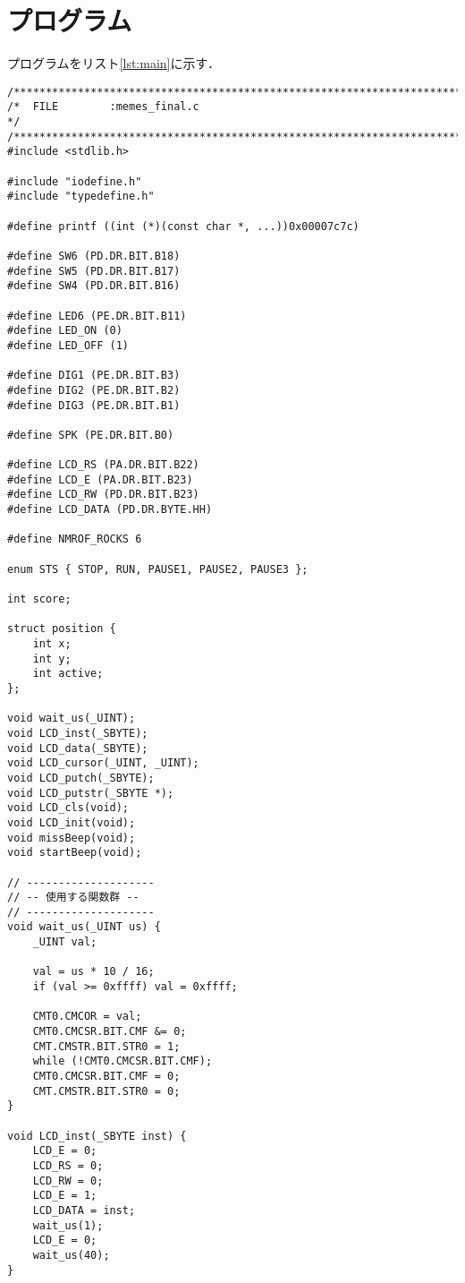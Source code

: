 \documentclass[a4paper,11pt,dvipdfmx]{jsarticle}
\begin{document}
\section{プログラム}
プログラムをリスト\ref{lst:main}に示す．

\begin{lstlisting}[caption=main.c, label=lst:main]
  /***********************************************************************/
/*  FILE        :memes_final.c                                         */
/***********************************************************************/
#include <stdlib.h>

#include "iodefine.h"
#include "typedefine.h"

#define printf ((int (*)(const char *, ...))0x00007c7c)

#define SW6 (PD.DR.BIT.B18)
#define SW5 (PD.DR.BIT.B17)
#define SW4 (PD.DR.BIT.B16)

#define LED6 (PE.DR.BIT.B11)
#define LED_ON (0)
#define LED_OFF (1)

#define DIG1 (PE.DR.BIT.B3)
#define DIG2 (PE.DR.BIT.B2)
#define DIG3 (PE.DR.BIT.B1)

#define SPK (PE.DR.BIT.B0)

#define LCD_RS (PA.DR.BIT.B22)
#define LCD_E (PA.DR.BIT.B23)
#define LCD_RW (PD.DR.BIT.B23)
#define LCD_DATA (PD.DR.BYTE.HH)

#define NMROF_ROCKS 6

enum STS { STOP, RUN, PAUSE1, PAUSE2, PAUSE3 };

int score;

struct position {
    int x;
    int y;
    int active;
};

void wait_us(_UINT);
void LCD_inst(_SBYTE);
void LCD_data(_SBYTE);
void LCD_cursor(_UINT, _UINT);
void LCD_putch(_SBYTE);
void LCD_putstr(_SBYTE *);
void LCD_cls(void);
void LCD_init(void);
void missBeep(void);
void startBeep(void);

// --------------------
// -- 使用する関数群 --
// --------------------
void wait_us(_UINT us) {
    _UINT val;

    val = us * 10 / 16;
    if (val >= 0xffff) val = 0xffff;

    CMT0.CMCOR = val;
    CMT0.CMCSR.BIT.CMF &= 0;
    CMT.CMSTR.BIT.STR0 = 1;
    while (!CMT0.CMCSR.BIT.CMF);
    CMT0.CMCSR.BIT.CMF = 0;
    CMT.CMSTR.BIT.STR0 = 0;
}

void LCD_inst(_SBYTE inst) {
    LCD_E = 0;
    LCD_RS = 0;
    LCD_RW = 0;
    LCD_E = 1;
    LCD_DATA = inst;
    wait_us(1);
    LCD_E = 0;
    wait_us(40);
}


\end{lstlisting}
\end{document}
